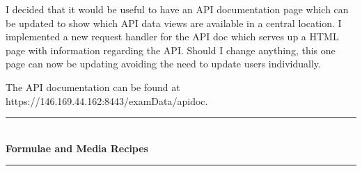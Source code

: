 \documentclass[idxtotoc,hyperref,openany]{labbook} %
\newcommand{\HRule}{\rule{\linewidth}{0.5mm}} %
\begin{document}

I decided that it would be useful to have an API documentation page which can be updated to show which API data views are available in a central location.  I implemented a new request handler for the API doc which serves up a HTML page with information regarding the API.  Should I change anything, this one page can now be updating avoiding the need to update users individually.

The API documentation can be found at https://146.169.44.162:8443/examData/apidoc.



\labday{} %

\begin{center}
\HRule \\[0.4cm]
{\huge \textbf{Formulae and Media Recipes}}\\[0.4cm] %
\HRule \\[1.5cm]
\end{center}


\newpage





\newpage




\end{document}
